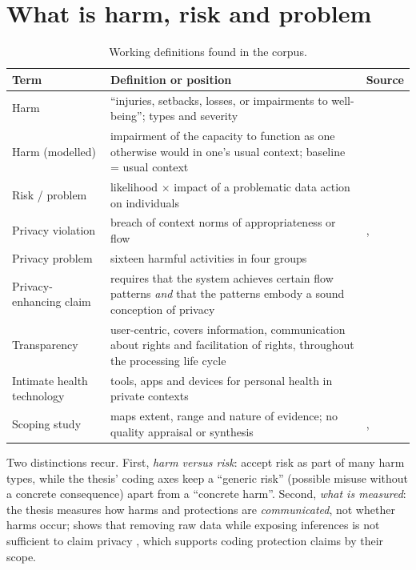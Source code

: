 \section{What is harm, risk and problem}
\begin{table}[t]
\centering\small
\caption{Working definitions found in the corpus.}
\label{tab:S-defs}
\begin{tabularx}{\textwidth}{@{}P{2.3cm}YP{2.6cm}@{}}
\toprule
\textbf{Term} & \textbf{Definition or position} & \textbf{Source}\\
\midrule
Harm & ``injuries, setbacks, losses, or impairments to well-being''; types and severity & \\
Harm (modelled) & impairment of the capacity to function as one otherwise would in one's usual context; baseline = usual context & \\
Risk / problem & likelihood $\times$ impact of a problematic data action on individuals & \\
Privacy violation & breach of context norms of appropriateness or flow & , \\
Privacy problem & sixteen harmful activities in four groups & \\
Privacy-enhancing claim & requires that the system achieves certain flow patterns \emph{and} that the patterns embody a sound conception of privacy & \\
Transparency & user-centric, covers information, communication about rights and facilitation of rights, throughout the processing life cycle & \\
Intimate health technology & tools, apps and devices for personal health in private contexts & \\
Scoping study & maps extent, range and nature of evidence; no quality appraisal or synthesis & , \\
\bottomrule
\end{tabularx}
\end{table}
Two distinctions recur. First, \emph{harm versus risk}:  accept risk as part of many harm types, while the thesis' coding axes keep a ``generic risk'' (possible misuse without a concrete consequence) apart from a ``concrete harm''. Second, \emph{what is measured}: the thesis measures how harms and protections are \emph{communicated}, not whether harms occur;  shows that removing raw data while exposing inferences is not sufficient to claim privacy , which supports coding protection claims by their scope.

